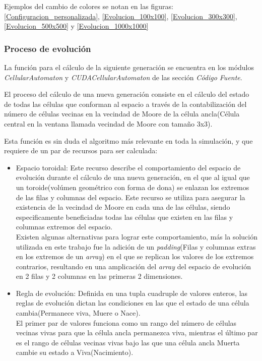 \documentclass[]{article}
\begin{document}
			Ejemplos del cambio de colores se notan en las figuras: \ref{Configuracion_personalizada}, \ref{Evolucion_100x100}, \ref{Evolucion_300x300}, \ref{Evolucion_500x500} y \ref{Evolucion_1000x1000}		
		
		\newpage
		\subsubsection{Proceso de evolución}
			La función para el cálculo de la siguiente generación se encuentra en los módulos \textit{CellularAutomaton} y \textit{CUDACellularAutomaton} de las sección \textit{Código Fuente}.
			
			El proceso del cálculo de una nueva generación consiste en el cálculo del estado de todas las células que conforman al espacio a través de la contabilización del número de células vecinas en la vecindad de Moore de la célula ancla(Célula central en la ventana llamada vecindad de Moore con tamaño 3x3).
			
			Esta función es sin duda el algoritmo más relevante en toda la simulación, y que requiere de un par de recursos para ser calculada:
			\begin{itemize}
				\item Espacio toroidal: Este recurso describe el comportamiento del espacio de evolución durante el cálculo de una nueva generación, en el que al igual que un toroide(volúmen geométrico con forma de dona) se enlazan los extremos de las filas y columnas del espacio. Este recurso se utiliza para asegurar la existencia de la vecindad de Moore en cada una de las células, siendo especificamente beneficiadas todas las células que existen en las filas y columnas extremos del espacio. \\ Existen algunas alternativas para lograr este comportamiento, más la solución utilizada en este trabajo fue la adición de un \textit{padding}(Filas y columnas extras en los extremos de un \textit{array}) en el que se replican los valores de los extremos contrarios, resultando en una amplicación del \textit{array} del espacio de evolución en 2 filas y 2 columnas en las primeras 2 dimensiones.
				\item Regla de evolución: Definida en una tupla cuadruple de valores enteros, las reglas de evolución dictan las condiciones en las que el estado de una célula cambia(Permanece viva, Muere o Nace).\\ El primer par de valores funciona como un rango del número de células vecinas vivas para que la célula ancla permanezca viva, mientras el último par es el rango de células vecinas vivas bajo las que una célula ancla Muerta cambie su estado a Viva(Nacimiento).
			\end{itemize}
		
\end{document}
